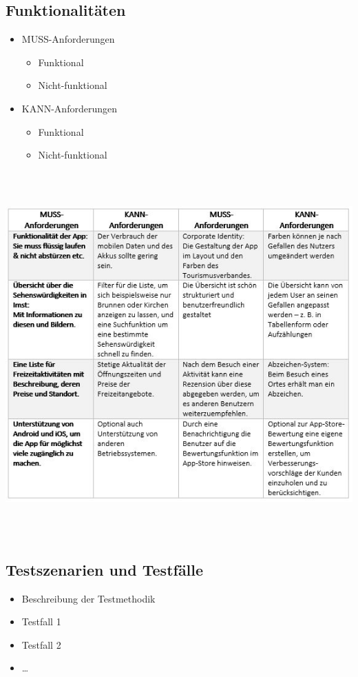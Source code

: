 \subsection{Funktionalitäten}
\begin{itemize}
	\item MUSS-Anforderungen
	\begin{itemize}
		\item Funktional
		\item Nicht-funktional
	\end{itemize}
	\item KANN-Anforderungen
	\begin{itemize}
		\item Funktional
		\item Nicht-funktional
	\end{itemize}
\end{itemize}

\includegraphics[height=14cm]{musskann}\\

\subsection{Testszenarien und Testfälle}
\begin{itemize}
	\item Beschreibung der Testmethodik
	\item Testfall 1
	\item Testfall 2
	\item \ldots
\end{itemize}
